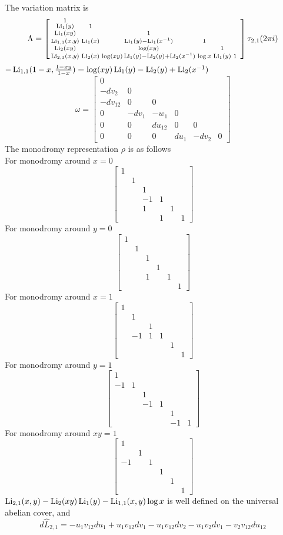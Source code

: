 \documentclass[main]{subfiles}
\begin{document}
The variation matrix is
\[\Lambda=\left[\begin{smallmatrix}
1&&&&&&\\
\operatorname{Li}_{1}(y)&1&&&&\\
\operatorname{Li}_{1}(xy)&&1&&&\\
\operatorname{Li}_{1,1}(x,y)&\operatorname{Li}_1(x)&\operatorname{Li}_1(y)-\operatorname{Li}_1(x^{-1})&1&&\\
\operatorname{Li}_{2}(xy)&&\log(xy)&&1&\\
\operatorname{Li}_{2,1}(x,y)&\operatorname{Li}_2(x)&\log(xy)\operatorname{Li}_1(y)-\operatorname{Li}_2(y)+\operatorname{Li}_2(x^{-1})&\log x&\operatorname{Li}_1(y)&1
\end{smallmatrix}\right]\tau_{2,1}(2\pi i)\]
$-\operatorname{Li}_{1,1}(1-x,\frac{1-xy}{1-x})=\log(xy)\operatorname{Li}_1(y)-\operatorname{Li}_2(y)+\operatorname{Li}_2(x^{-1})$
\[\omega=\begin{bmatrix}
0&&&&&\\
-dv_2&0&&&&\\
-dv_{12}&0&0&&\\
0&-dv_1&-w_1&0&&\\
0&0&du_{12}&0&0&\\
0&0&0&du_1&-dv_2&0
\end{bmatrix}\]
The monodromy representation $\rho$ is as follows \\
For monodromy around $x=0$
\[\begin{bmatrix}
1&&&&& \\
&1&&&& \\
&&1&&& \\
&&-1&1&& \\
&&1&&1& \\
&&&1&&1
\end{bmatrix}\]
For monodromy around $y=0$
\[\begin{bmatrix}
1&&&&& \\
&1&&&& \\
&&1&&& \\
&&&1&& \\
&&1&&1& \\
&&&&&1
\end{bmatrix}\]
For monodromy around $x=1$
\[\begin{bmatrix}
1&&&&& \\
&1&&&& \\
&&1&&& \\
&-1&1&1&& \\
&&&&1& \\
&&&&&1
\end{bmatrix}\]
For monodromy around $y=1$
\[\begin{bmatrix}
1&&&&& \\
-1&1&&&& \\
&&1&&& \\
&&-1&1&& \\
&&&&1& \\
&&&&-1&1
\end{bmatrix}\]
For monodromy around $xy=1$
\[\begin{bmatrix}
1&&&&& \\
&1&&&& \\
-1&&1&&& \\
&&&1&& \\
&&&&1& \\
&&&&&1
\end{bmatrix}\]
$\operatorname{Li}_{2,1}(x,y)-\operatorname{Li}_2(xy)\operatorname{Li}_1(y)-\operatorname{Li}_{1,1}(x,y)\log x$ is well defined on the universal abelian cover, and
\[d\widehat L_{2,1}=-u_1v_{12}du_1+u_1v_{12}dv_1-u_1v_{12}dv_2-u_1v_2dv_1-v_2v_{12}du_{12}\]
\end{document}
